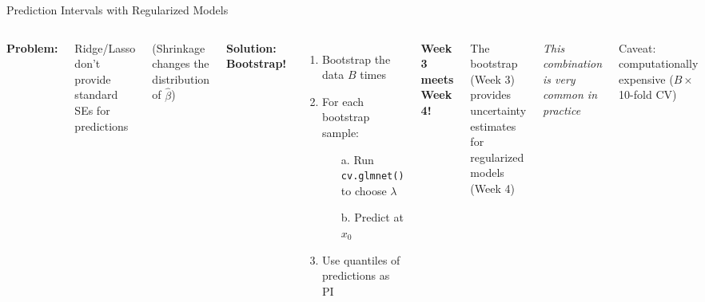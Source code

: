 \documentclass[aspectratio=169, 11pt]{beamer}
\begin{document}
\begin{frame}{Prediction Intervals with Regularized Models}
\begin{columns}
\textbf{Problem:}

Ridge/Lasso don't provide standard SEs for predictions

(Shrinkage changes the distribution of $\hat{\beta}$)

\vspace{0.5em}
\textbf{Solution: Bootstrap!}

\begin{enumerate}
  \item Bootstrap the data $B$ times
  \item For each bootstrap sample:
  \begin{enumerate}
    \item[a.] Run \texttt{cv.glmnet()} to choose $\lambda$
    \item[b.] Predict at $x_0$
  \end{enumerate}
  \item Use quantiles of predictions as PI
\end{enumerate}

\textbf{Week 3 meets Week 4!}

The bootstrap (Week 3) provides uncertainty estimates for regularized models (Week 4)

\vspace{0.5em}
\textit{This combination is very common in practice}

\vspace{0.3em}
Caveat: computationally expensive ($B \times$ 10-fold CV)
\end{columns}
\end{frame}
\end{document}
